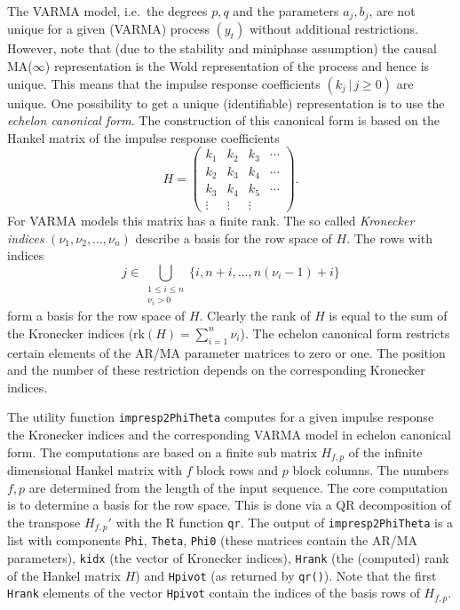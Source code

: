 \documentclass[]{article}
\begin{document}
The VARMA model, i.e.~the degrees \(p,q\) and the parameters
\(a_j,b_j\), are not unique for a given (VARMA) process \((y_t)\)
without additional restrictions. However, note that (due to the
stability and miniphase assumption) the causal MA(\(\infty\))
representation is the Wold representation of the process and hence is
unique. This means that the impulse response coefficients
\((k_j\,|\,j\geq 0)\) are unique. One possibility to get a unique
(identifiable) representation is to use the \emph{echelon canonical
form}. The construction of this canonical form is based on the Hankel
matrix of the impulse response coefficients \[
H = \begin{pmatrix} 
k_1 & k_2 & k_3 & \cdots \\
k_2 & k_3 & k_4 & \cdots \\
k_3 & k_4 & k_5 & \cdots \\
\vdots & \vdots & \vdots & 
\end{pmatrix}.
\] For VARMA models this matrix has a finite rank. The so called
\emph{Kronecker indices} \((\nu_1,\nu_2,\ldots,\nu_n)\) describe a basis
for the row space of \(H\). The rows with indices \[
j \in \bigcup_{\begin{smallmatrix}1\leq i\leq n \\ \nu_i>0 \end{smallmatrix}} \{i, n+i, \ldots, n(\nu_i-1)+i\}
\] form a basis for the row space of \(H\). Clearly the rank of \(H\) is
equal to the sum of the Kronecker indices
(\(\mbox{rk}(H)=\sum_{i=1}^n \nu_i\)). The echelon canonical form
restricts certain elements of the AR/MA parameter matrices to zero or
one. The position and the number of these restriction depends on the
corresponding Kronecker indices.

The utility function \texttt{impresp2PhiTheta} computes for a given
impulse response the Kronecker indices and the corresponding VARMA model
in echelon canonical form. The computations are based on a finite sub
matrix \(H_{f,p}\) of the infinite dimensional Hankel matrix with \(f\)
block rows and \(p\) block columns. The numbers \(f,p\) are determined
from the length of the input sequence. The core computation is to
determine a basis for the row space. This is done via a QR decomposition
of the transpose \(H_{f,p}'\) with the R function \texttt{qr}. The
output of \texttt{impresp2PhiTheta} is a list with components
\texttt{Phi}, \texttt{Theta}, \texttt{Phi0} (these matrices contain the
AR/MA parameters), \texttt{kidx} (the vector of Kronecker indices),
\texttt{Hrank} (the (computed) rank of the Hankel matrix \(H\)) and
\texttt{Hpivot} (as returned by \texttt{qr()}). Note that the first
\texttt{Hrank} elements of the vector \texttt{Hpivot} contain the
indices of the basis rows of \(H_{f,p}\).
\end{document}
